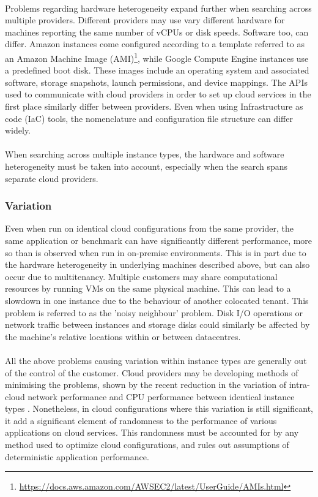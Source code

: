 \documentclass{report}
\begin{document}
\paragraph{}
Problems regarding hardware heterogeneity expand further when searching across multiple providers. Different providers may use vary different hardware for machines reporting the same number of vCPUs or disk speeds. Software too, can differ. Amazon instances come configured according to a template referred to as an Amazon Machine Image (AMI)\footnote{\url{https://docs.aws.amazon.com/AWSEC2/latest/UserGuide/AMIs.html}}, while Google Compute Engine instances use a predefined boot disk. These images include an operating system and associated software, storage snapshots, launch permissions, and device mappings. The APIs used to communicate with cloud providers in order to set up cloud services in the first place similarly differ between providers. Even when using Infrastructure as code (IaC) tools, the nomenclature and configuration file structure can differ widely.
\paragraph{}
When searching across multiple instance types, the hardware and software heterogeneity must be taken into account, especially when the search spans separate cloud providers. 
\subsubsection{Variation}
Even when run on identical cloud configurations from the same provider, the same application or benchmark can have significantly different performance, more so than is observed when run in on-premise environments\cite{Leitner2014}. This is in part due to the hardware heterogeneity in underlying machines described above, but can also occur due to multitenancy. Multiple customers may share computational resources by running VMs on the same physical machine. This can lead to a slowdown in one instance due to the behaviour of another colocated tenant. This problem is referred to as the 'noisy neighbour' problem\cite{Gkatzikis2013}. Disk I/O operations or network traffic between instances and storage disks could similarly be affected by the machine's relative locations within or between datacentres. 
\paragraph{}
All the above problems causing variation within instance types are generally out of the control of the customer. Cloud providers may be developing methods of minimising the problems, shown by the recent reduction in the variation of intra-cloud network performance\cite{Scheuner2018, Scheuner2018a} and CPU performance between identical instance types \cite{Davatz2017, Laaber2019, Scheuner2018}.  Nonetheless, in cloud configurations where this variation is still significant, it add a significant element of randomness to the performance of various applications on cloud services. This randomness must be accounted for by any method used to optimize cloud configurations, and rules out assumptions of deterministic application performance. 
\end{document}

